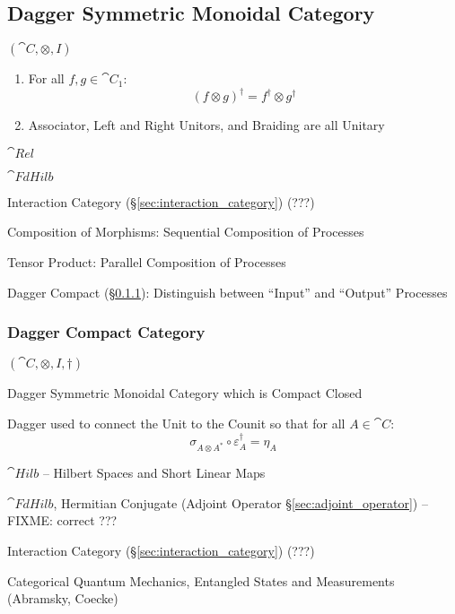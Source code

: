 \subsection{Dagger Symmetric Monoidal Category}
\label{sec:dagger_symmetric_monoidal}

$(\cat{C}, \otimes, I)$

\begin{enumerate}
  \item For all $f,g \in \cat{C}_1$:
    \[
      (f \otimes g)^\dag = f^\dag \otimes g^\dag
    \]
  \item Associator, Left and Right Unitors, and Braiding are all
    Unitary
\end{enumerate}

$\cat{Rel}$

$\cat{FdHilb}$

Interaction Category (\S\ref{sec:interaction_category}) (???)

Composition of Morphisms: Sequential Composition of Processes

Tensor Product: Parallel Composition of Processes

Dagger Compact (\S\ref{sec:dagger_compact}): Distinguish between
``Input'' and ``Output'' Processes




\subsubsection{Dagger Compact Category}\label{sec:dagger_compact}

$(\cat{C}, \otimes, I, \dag)$

Dagger Symmetric Monoidal Category which is Compact Closed

Dagger used to connect the Unit to the Counit so that for all $A \in
\cat{C}$:
\[
  \sigma_{A \otimes A^*} \circ \varepsilon_A^\dag = \eta_A
\]

$\cat{Hilb}$ -- Hilbert Spaces and Short Linear Maps

$\cat{FdHilb}$, Hermitian Conjugate (Adjoint Operator
\S\ref{sec:adjoint_operator}) --FIXME: correct ???

Interaction Category (\S\ref{sec:interaction_category}) (???)

Categorical Quantum Mechanics, Entangled States and Measurements
(Abramsky, Coecke)



